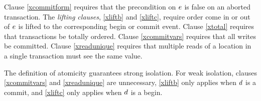 Clause \eqref{xcommitform} requires that the precondition on $e$ is false on an
aborted transaction.
The \emph{lifting clauses}, \eqref{xliftb} and \eqref{xliftc}, require order
come in or out of $e$ is lifted to the corresponding begin or commit event.
Clause \eqref{xtotal} requires that transactions be totally ordered.
Clause \eqref{xcommitvars} requires that all writes be committed.
Clause \eqref{xreadunique} requires that multiple reads of a location in a
single transaction must see the same value.


The definition of atomicity guarantees strong isolation.  For weak isolation,
clauses \eqref{xcommitvars} and \eqref{xreadunique} are unnecessary,
\eqref{xliftb} only applies when $d$ is a commit, and \eqref{xliftc} only
applies when $d$ is a begin.

